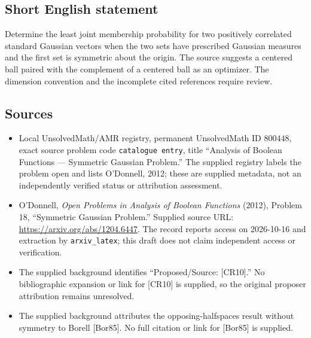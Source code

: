 \documentclass[11pt]{article}
\begin{document}
\subsection{Short English statement}
Determine the least joint membership probability for two positively correlated standard Gaussian vectors when the two sets have prescribed Gaussian measures and the first set is symmetric about the origin. The source suggests a centered ball paired with the complement of a centered ball as an optimizer. The dimension convention and the incomplete cited references require review.
\subsection{Sources}
\begin{itemize}
\item Local UnsolvedMath/AMR registry, permanent UnsolvedMath ID \(800448\), exact source problem code \texttt{catalogue entry}, title ``Analysis of Boolean Functions --- Symmetric Gaussian Problem.'' The supplied registry labels the problem open and lists O'Donnell, 2012; these are supplied metadata, not an independently verified status or attribution assessment.
\item O'Donnell, \emph{Open Problems in Analysis of Boolean Functions} (2012), Problem 18, ``Symmetric Gaussian Problem.'' Supplied source URL: \url{https://arxiv.org/abs/1204.6447}. The record reports access on 2026-10-16 and extraction by \texttt{arxiv\_latex}; this draft does not claim independent access or verification.
\item The supplied background identifies ``Proposed/Source: [CR10].'' No bibliographic expansion or link for [CR10] is supplied, so the original proposer attribution remains unresolved.
\item The supplied background attributes the opposing-halfspaces result without symmetry to Borell [Bor85]. No full citation or link for [Bor85] is supplied.
\end{itemize}
\end{document}
